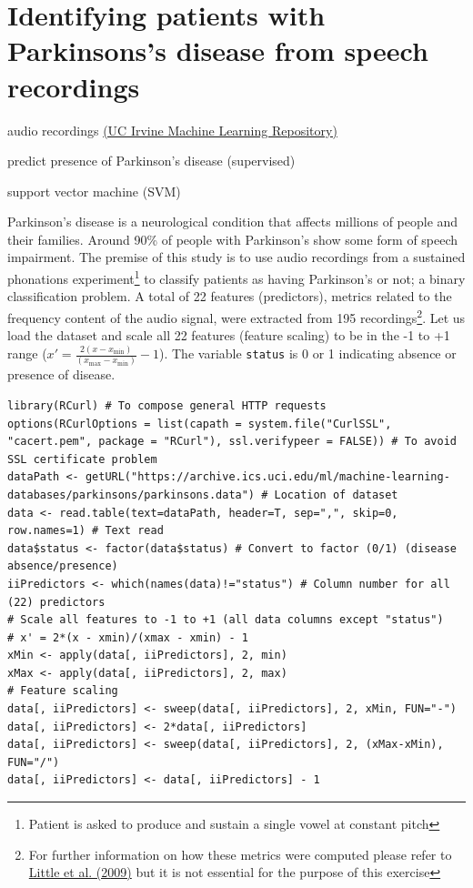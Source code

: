 \documentclass[a4paper,11pt]{article}
\begin{document}
\section{Identifying patients with Parkinsons's disease from speech recordings}
\begin{framed}
\begin{description}[leftmargin=5em,style=nextline]\addtolength{\itemsep}{-0.2\baselineskip}
	\item[Data:] audio recordings \href{https://archive.ics.uci.edu/ml/datasets/Parkinsons}{(UC Irvine Machine Learning Repository)}	
	\item[Task:] predict presence of Parkinson's disease (supervised)
	\item[Method:] support vector machine (SVM)
\end{description} 
\end{framed}

Parkinson's disease is a neurological condition that affects millions of people and their families. Around 90\% of 
people with Parkinson's show some form of speech impairment. The premise of this study is to use audio recordings
from a sustained phonations experiment\footnote{Patient is asked to produce and sustain a single vowel at constant pitch}
to classify patients as having Parkinson's or not; a binary classification problem. A total of 22 features (predictors), metrics
related to the frequency content of the audio signal, were extracted from 195 recordings\footnote{For further information on how these 
metrics were computed please refer to \href{http://www.ncbi.nlm.nih.gov/pmc/articles/PMC3051371/}{Little et al. (2009)} but it is not essential for the purpose of this exercise}.
Let us load the dataset and scale all 22 features (feature scaling) to be in the -1 to +1 range ($x' = \frac{2(x - x_{\mathrm{min}})}{(x_{\mathrm{max}}-x_{\mathrm{min}})}-1$). 
The variable \texttt{status} is 0 or 1 indicating absence or presence of disease. 
\\
\begin{lstlisting}[style=RCode]
library(RCurl) # To compose general HTTP requests
options(RCurlOptions = list(capath = system.file("CurlSSL", "cacert.pem", package = "RCurl"), ssl.verifypeer = FALSE)) # To avoid SSL certificate problem 
dataPath <- getURL("https://archive.ics.uci.edu/ml/machine-learning-databases/parkinsons/parkinsons.data") # Location of dataset
data <- read.table(text=dataPath, header=T, sep=",", skip=0, row.names=1) # Text read
data$status <- factor(data$status) # Convert to factor (0/1) (disease absence/presence)
iiPredictors <- which(names(data)!="status") # Column number for all (22) predictors
# Scale all features to -1 to +1 (all data columns except "status")
# x' = 2*(x - xmin)/(xmax - xmin) - 1
xMin <- apply(data[, iiPredictors], 2, min)
xMax <- apply(data[, iiPredictors], 2, max)
# Feature scaling
data[, iiPredictors] <- sweep(data[, iiPredictors], 2, xMin, FUN="-")
data[, iiPredictors] <- 2*data[, iiPredictors]
data[, iiPredictors] <- sweep(data[, iiPredictors], 2, (xMax-xMin), FUN="/")
data[, iiPredictors] <- data[, iiPredictors] - 1
\end{lstlisting}
\end{document}
